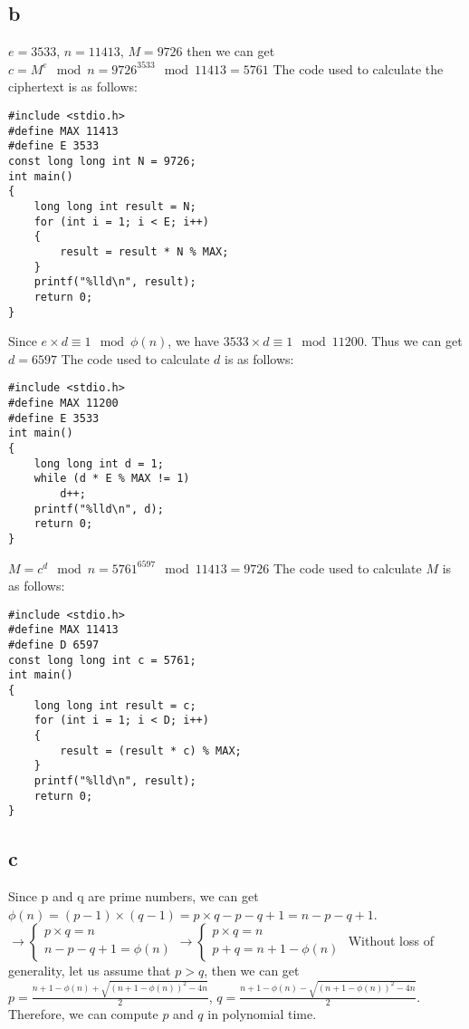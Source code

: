 \documentclass[12pt]{article}
\begin{document}
\subsection{b}
$e=3533$, $n=11413$, $M=9726$ then we can get $c=M^e\mod n=9726^{3533}\mod 11413=5761$
\newline
The code used to calculate the ciphertext is as follows:
\newline
\begin{lstlisting}
#include <stdio.h>
#define MAX 11413
#define E 3533
const long long int N = 9726;
int main()
{
    long long int result = N;
    for (int i = 1; i < E; i++)
    {
        result = result * N % MAX;
    }
    printf("%lld\n", result);
    return 0;
}
\end{lstlisting}
Since $e\times d\equiv 1\mod\phi(n)$, we have $3533\times d\equiv 1\mod 11200$. Thus we can get $d=6597$
\newline
The code used to calculate $d$ is as follows:
\begin{lstlisting}
#include <stdio.h>
#define MAX 11200
#define E 3533
int main()
{
    long long int d = 1;
    while (d * E % MAX != 1)
        d++;
    printf("%lld\n", d);
    return 0;
}
\end{lstlisting}
$M=c^d\mod n=5761^{6597}\mod 11413=9726$
\newline
The code used to calculate $M$ is as follows:
\begin{lstlisting}
#include <stdio.h>
#define MAX 11413
#define D 6597
const long long int c = 5761;
int main()
{
    long long int result = c;
    for (int i = 1; i < D; i++)
    {
        result = (result * c) % MAX;
    }
    printf("%lld\n", result);
    return 0;
}
\end{lstlisting}
\subsection{c}
Since p and q are prime numbers, we can get $\phi(n)=(p-1)\times(q-1)=p\times q-p-q+1=n-p-q+1$.
$\rightarrow \begin{cases} p\times q=n\\ n-p-q+1=\phi(n)\end{cases}\rightarrow \begin{cases} p\times q=n\\ p+q=n+1-\phi(n)\end{cases}$
\newline
Without loss of generality, let us assume that $p>q$, then we can get $p=\frac{n+1-\phi(n)+\sqrt{(n+1-\phi(n))^2-4n}}{2}$, $q=\frac{n+1-\phi(n)-\sqrt{(n+1-\phi(n))^2-4n}}{2}$.
\newline
Therefore, we can compute $p$ and $q$ in polynomial time.
\end{document}
